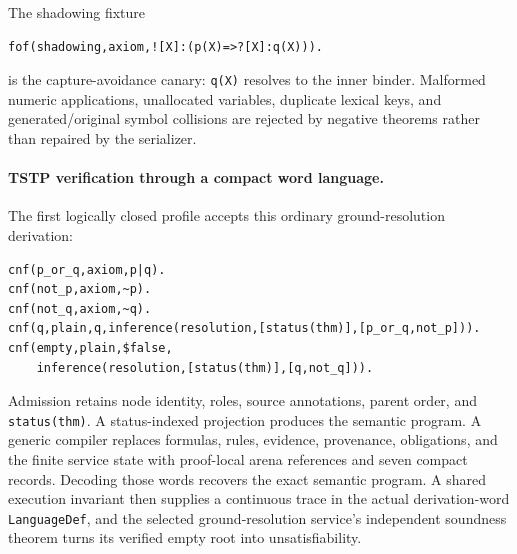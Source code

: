 \documentclass[11pt]{article}
\newcommand{\code}[1]{\texttt{#1}}
\begin{document}
The shadowing fixture

\begin{lstlisting}[language={}]
fof(shadowing,axiom,![X]:(p(X)=>?[X]:q(X))).
\end{lstlisting}

\noindent
is the capture-avoidance canary: \code{q(X)} resolves to the inner binder.
Malformed numeric applications, unallocated variables, duplicate lexical
keys, and generated/original symbol collisions are rejected by negative
theorems rather than repaired by the serializer.

\paragraph{TSTP verification through a compact word language.}
The first logically closed profile accepts this ordinary ground-resolution
derivation:

\begin{lstlisting}[language={},caption={The ground TSTP canary}]
cnf(p_or_q,axiom,p|q).
cnf(not_p,axiom,~p).
cnf(not_q,axiom,~q).
cnf(q,plain,q,inference(resolution,[status(thm)],[p_or_q,not_p])).
cnf(empty,plain,$false,
    inference(resolution,[status(thm)],[q,not_q])).
\end{lstlisting}

\noindent
Admission retains node identity, roles, source annotations, parent order,
and \code{status(thm)}.  A status-indexed projection produces the semantic
program.  A generic compiler replaces formulas, rules, evidence, provenance,
obligations, and the finite service state with proof-local arena references
and seven compact records.  Decoding those words recovers the exact semantic
program.  A shared execution invariant then supplies a continuous trace in
the actual derivation-word \code{LanguageDef}, and the selected
ground-resolution service's independent soundness theorem turns its verified
empty root into unsatisfiability.

\begin{center}
\end{center}
\end{document}
